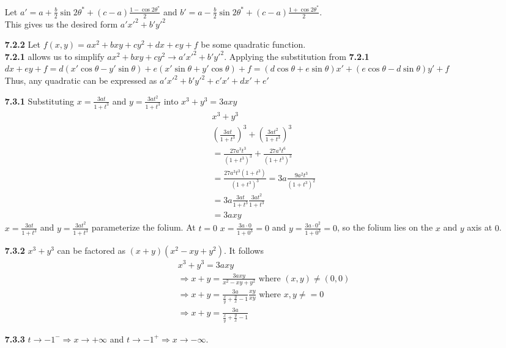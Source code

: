 \documentclass[10pt]{article}
\begin{document}
\begin{enumerate}
        Let $a'=a+\frac{b}{2}\sin2\theta^*+(c-a)\frac{1-\cos2\theta^*}{2}$ and $b'=a-\frac{b}{2}\sin2\theta^*+(c-a)\frac{1+\cos2\theta^*}{2}$.\\
       This gives us the desired form $a'{x'}^2+b'{y'}^2$
    \item [\textbf{7.2.2}] Let $f(x,y)=ax^2+bxy+cy^2+dx+ey+f$ be some quadratic function.\\
    \textbf{7.2.1} allows us to simplify $ax^2+bxy+cy^2\rightarrow a'{x'}^2+b'{y'}^2$.
    Applying the substitution from \textbf{7.2.1}
    $dx+ey+f=d(x'\cos\theta-y'\sin\theta)+e(x'\sin\theta+y'\cos\theta)+f=(d\cos\theta+e\sin\theta)x'+(e\cos\theta-d\sin\theta)y'+f$\\
    Thus, any quadratic can be expressed as $a'{x'}^2+b'{y'}^2+c'x'+dx'+e'$
    \item [\textbf{7.3.1}] Substituting $x=\frac{3at}{1+t^3}$ and $y=\frac{3at^2}{1+t^3}$ into $x^3+y^3=3axy$
    \begin{align*}
        &x^3+y^3\\
        &{(\frac{3at}{1+t^3})}^3+{(\frac{3at^2}{1+t^3})}^3\\
        &=\frac{27a^3t^3}{{(1+t^3)}^3}+\frac{27a^3t^6}{{(1+t^3)}^3}\\
        &=\frac{27a^3t^3(1+t^3)}{{(1+t^3)}^3}=3a\frac{9a^2t^3}{{(1+t^3)}^2}\\
        &=3a\frac{3at}{1+t^3}\frac{3at^2}{1+t^3}\\
        &=3axy
    \end{align*}
    $x=\frac{3at}{1+t^3}$ and $y=\frac{3at^2}{1+t^3}$ parameterize the folium.
    At $t=0$ $x=\frac{3a\cdot0}{1+0^3}=0$ and $y=\frac{3a\cdot 0^2}{1+0^3}=0$, so the folium lies on the $x$ and $y$ axis at $0$.
    \item [\textbf{7.3.2}] $x^3+y^3$ can be factored as $(x+y)(x^2-xy+y^2)$. It follows
    \begin{align*}
        &x^3+y^3=3axy\\
        &\Rightarrow x+y=\frac{3axy}{x^2-xy+y^2} \text{ where }(x,y)\neq(0,0)\\
        &\Rightarrow x+y=\frac{3a}{\frac{x}{y}+\frac{y}{x}-1}\frac{xy}{xy} \text{ where }x,y\neq=0\\
        &\Rightarrow x+y=\frac{3a}{\frac{x}{y}+\frac{y}{x}-1}
    \end{align*}
    \item [\textbf{7.3.3}] $t\rightarrow -1^-\Rightarrow x\rightarrow +\infty$ and $t\rightarrow -1^+\Rightarrow x\rightarrow -\infty$.\\

\end{enumerate}
\end{document}
